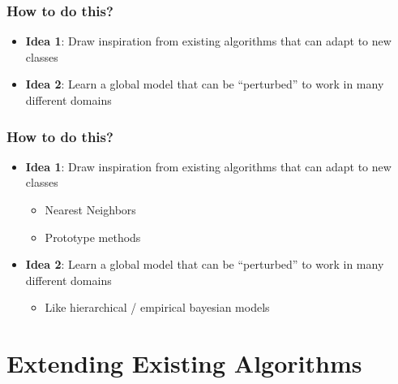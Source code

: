 \documentclass[10pt,mathserif]{beamer}
\begin{document}
\begin{frame}
  \frametitle{How to do this?}
  \begin{itemize}
  \item \textbf{Idea 1}: Draw inspiration from existing algorithms that can
    adapt to new classes
  \item \textbf{Idea 2}: Learn a global model that can be ``perturbed'' to work
    in many different domains
  \end{itemize}
\end{frame}

\begin{frame}
  \frametitle{How to do this?}
  \begin{itemize}
  \item \textbf{Idea 1}: Draw inspiration from existing algorithms that can
    adapt to new classes
    \begin{itemize}
    \item Nearest Neighbors
    \item Prototype methods
    \end{itemize}
  \item \textbf{Idea 2}: Learn a global model that can be ``perturbed'' to work
    in many different domains
    \begin{itemize}
    \item Like hierarchical / empirical bayesian models
    \end{itemize}
  \end{itemize}
\end{frame}

\section{Extending Existing Algorithms}
\end{document}
